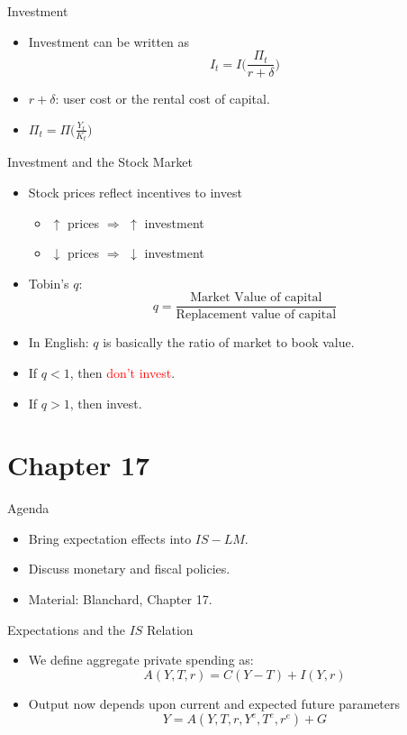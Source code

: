\documentclass[shownotes,11pt, aspectratio=169]{beamer}
\begin{document}
\begin{frame}{Investment}
\begin{itemize}
\item Investment can be written as 
     \[ I_t = I\Bigg(\frac{\Pi_t}{r + \delta}\Bigg) \]
\pause
\item $r + \delta$: user cost or the rental cost of capital.
\pause
\item $\Pi_t = \Pi\Bigg(\frac{Y_t}{K_t}\Bigg)$
\end{itemize}
\end{frame}

\begin{frame}{Investment and the Stock Market}
\begin{itemize}
\item Stock prices reflect incentives to invest
      \begin{itemize} 
      \item $\uparrow$ prices $\Rightarrow$ $\uparrow$ investment
      \item $\downarrow$ prices $\Rightarrow$ $\downarrow$ investment
      \end{itemize}
\pause
\item Tobin's $q$: \[ q = \frac{\text{Market Value of capital}}{\text{Replacement value of capital}} \]
\item In English: $q$ is basically the ratio of market to book value.
\pause
\item If $q < 1$, then \textcolor{red}{don't invest}.
\item If $q > 1$, then \textcolor{ao(english)}{invest}.
\end{itemize}
\end{frame}

\section{Chapter 17}
\begin{frame}{Agenda}
\begin{itemize}
\item Bring expectation effects into $IS-LM$.
\item Discuss monetary and fiscal policies.
\item Material: Blanchard, Chapter 17.
\end{itemize}
\end{frame}

\begin{frame}{Expectations and the $IS$ Relation}
\begin{itemize}
\item We define aggregate private spending as: 
    \[ A(Y, T, r) = C(Y-T) + I(Y,r) \]
\pause
\item Output now depends upon current and expected future parameters
    \[ Y = A(Y, T, r, Y^e, T^e, r^e) + G \]
\end{itemize}
\end{frame}
\end{document}
